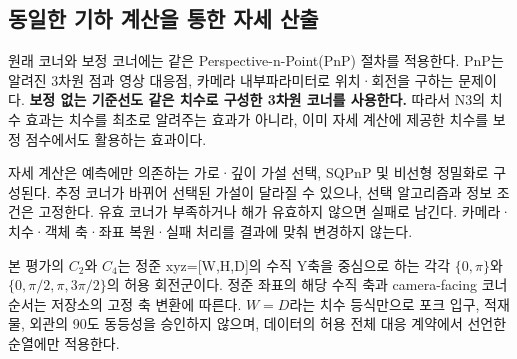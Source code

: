 \subsection{동일한 기하 계산을 통한 자세 산출}
원래 코너와 보정 코너에는 같은 Perspective-n-Point(PnP) 절차를 적용한다. PnP는 알려진 3차원 점과 영상 대응점, 카메라 내부파라미터로 위치·회전을 구하는 문제이다. \textbf{보정 없는 기준선도 같은 치수로 구성한 3차원 코너를 사용한다.} 따라서 N3의 치수 효과는 치수를 최초로 알려주는 효과가 아니라, 이미 자세 계산에 제공한 치수를 보정 점수에서도 활용하는 효과이다.

자세 계산은 예측에만 의존하는 가로·깊이 가설 선택, SQPnP\cite{sqpnp2020} 및 비선형 정밀화로 구성된다. 추정 코너가 바뀌어 선택된 가설이 달라질 수 있으나, 선택 알고리즘과 정보 조건은 고정한다. 유효 코너가 부족하거나 해가 유효하지 않으면 실패로 남긴다. 카메라·치수·객체 축·좌표 복원·실패 처리를 결과에 맞춰 변경하지 않는다.

본 평가의 $C_2$와 $C_4$는 정준 xyz=[W,H,D]의 수직 Y축을 중심으로 하는 각각 $\{0,\pi\}$와 $\{0,\pi/2,\pi,3\pi/2\}$의 허용 회전군이다. 정준 좌표의 해당 수직 축과 camera-facing 코너 순서는 저장소의 고정 축 변환에 따른다. $W=D$라는 치수 등식만으로 포크 입구, 적재물, 외관의 90도 동등성을 승인하지 않으며, 데이터의 허용 전체 대응 계약에서 선언한 순열에만 적용한다.
